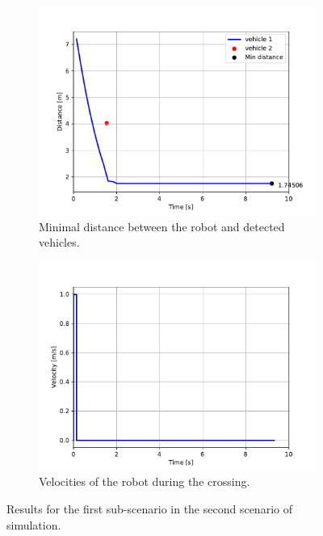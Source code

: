             \begin{figure}[H]
                \centering
                \begin{subfigure}{0.49\linewidth}
                    \centering
                    \includegraphics[trim={24 8 35 41}, clip, width=\linewidth]{images/simulations/scene2_1_dist.pdf}
                    \caption{Minimal distance between the robot and detected vehicles.}
                \end{subfigure}
                \begin{subfigure}{0.49\linewidth}
                    \centering
                    \includegraphics[trim={21 8 40 41}, clip, width=\linewidth]{images/simulations/scene2_1_vel.pdf}
                    \caption{Velocities of the robot during the crossing.}
                \end{subfigure}
                \caption{Results for the first sub-scenario in the second scenario of simulation.}
                \label{fig:scene2_1_graphs}
            \end{figure}
